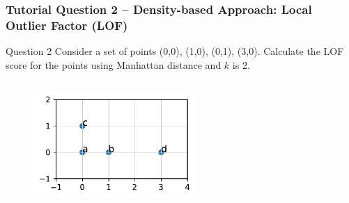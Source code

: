 \documentclass[aspectratio=169, 10pt]{beamer}
\begin{document}
\begin{frame}
    \frametitle{Tutorial Question 2 -- Density-based Approach: Local Outlier Factor (LOF)}
    \footnotesize

    \begin{block}{Question 2}
        Consider a set of points (0,0), (1,0), (0,1), (3,0). 
        Calculate the LOF score for the points using Manhattan distance and $k$ is 2.
    \end{block}
    
    \begin{columns}[t]
        \begin{column}{0.5\textwidth}

            \begin{figure}
                \centering
                \includegraphics[width=0.55\textwidth]{../imgs/outlier_lof.pdf}
            \end{figure}


\end{column}
\end{columns}
\end{frame}
\end{document}
